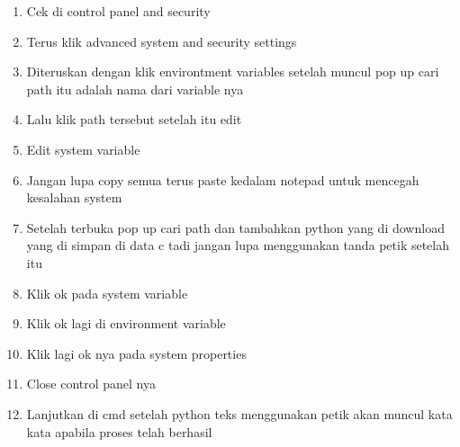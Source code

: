 \begin{enumerate}
\item	Cek di control panel and security
	
\item	Terus klik advanced system and security settings
	
\item	Diteruskan dengan klik environtment variables setelah muncul pop up cari path itu adalah nama dari variable nya
	
\item	Lalu klik path tersebut setelah itu edit
	
\item	Edit system variable
	
\item	Jangan lupa copy semua terus paste kedalam notepad untuk mencegah kesalahan system
	
\item	Setelah terbuka pop up cari path dan tambahkan python yang di download yang di simpan di data c tadi jangan lupa menggunakan tanda petik setelah itu
	
\item	Klik ok pada system variable
\item	Klik ok lagi di environment variable
	
\item	Klik lagi ok nya pada system properties
	
\item	Close control panel nya
	
\item 	Lanjutkan di cmd setelah python teks menggunakan petik akan muncul kata kata apabila proses telah berhasil
\end{enumerate}

